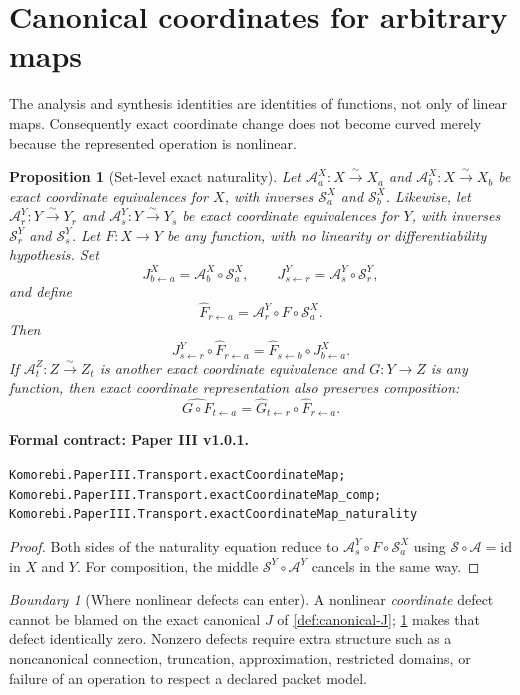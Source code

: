 \documentclass[11pt,a4paper]{article}
\theoremstyle{plain}
\newtheorem{proposition}[proposition]{Proposition}
\theoremstyle{definition}
\theoremstyle{remark}
\newtheorem{boundary}[boundary]{Boundary}
\newcommand{\cA}{\mathcal A}
\newcommand{\cS}{\mathcal S}
\newcommand{\id}{\mathrm{id}}
\newcommand{\leanname}[1]{\nolinkurl{#1}}
\newcommand{\statusleanthree}[1]{\par\smallskip\noindent\begin{minipage}{\linewidth}{\color{leanblue}\textbf{Formal contract: Paper III v1.0.1.}}\par\begingroup\small\raggedright\leanname{#1}\par\endgroup\end{minipage}\par\smallskip}
\begin{document}
\section{Canonical coordinates for arbitrary maps}
\label{sec:arbitrary-maps}

The analysis and synthesis identities are identities of functions, not only
of linear maps.  Consequently exact coordinate change does not become
curved merely because the represented operation is nonlinear.

\begin{proposition}[Set-level exact naturality]
\label{prop:set-naturality}
Let $\cA^X_a:X\xrightarrow{\sim}X_a$ and
$\cA^X_b:X\xrightarrow{\sim}X_b$ be exact coordinate equivalences for $X$,
with inverses $\cS^X_a$ and $\cS^X_b$.  Likewise, let
$\cA^Y_r:Y\xrightarrow{\sim}Y_r$ and
$\cA^Y_s:Y\xrightarrow{\sim}Y_s$ be exact coordinate equivalences for $Y$,
with inverses $\cS^Y_r$ and $\cS^Y_s$.  Let $F:X\to Y$ be any function, with
no linearity or differentiability hypothesis.  Set
\[
J^X_{b\leftarrow a}=\cA^X_b\circ\cS^X_a,
\qquad
J^Y_{s\leftarrow r}=\cA^Y_s\circ\cS^Y_r,
\]
and define
\[
\widehat F_{r\leftarrow a}
=
\cA^Y_r\circ F\circ\cS^X_a.
\]
Then
\[
J^Y_{s\leftarrow r}\circ\widehat F_{r\leftarrow a}
=
\widehat F_{s\leftarrow b}\circ J^X_{b\leftarrow a}.
\]
If $\cA^Z_t:Z\xrightarrow{\sim}Z_t$ is another exact coordinate equivalence
and $G:Y\to Z$ is any function, then exact coordinate representation also
preserves composition:
\[
\widehat{G\circ F}_{t\leftarrow a}
=
\widehat G_{t\leftarrow r}\circ\widehat F_{r\leftarrow a}.
\]
\end{proposition}
\statusleanthree{Komorebi.PaperIII.Transport.exactCoordinateMap; Komorebi.PaperIII.Transport.exactCoordinateMap_comp; Komorebi.PaperIII.Transport.exactCoordinateMap_naturality}

\begin{proof}
Both sides of the naturality equation reduce to
$\cA^Y_s\circ F\circ\cS^X_a$ using
$\cS\circ\cA=\id$ in $X$ and $Y$.  For composition, the middle
$\cS^Y\circ\cA^Y$ cancels in the same way.
\end{proof}

\begin{boundary}[Where nonlinear defects can enter]
A nonlinear \emph{coordinate} defect cannot be blamed on the exact canonical
$J$ of \cref{def:canonical-J}; \cref{prop:set-naturality} makes that defect
identically zero.  Nonzero defects require extra structure such as a
noncanonical connection, truncation, approximation, restricted domains, or
failure of an operation to respect a declared packet model.
\end{boundary}
\end{document}
